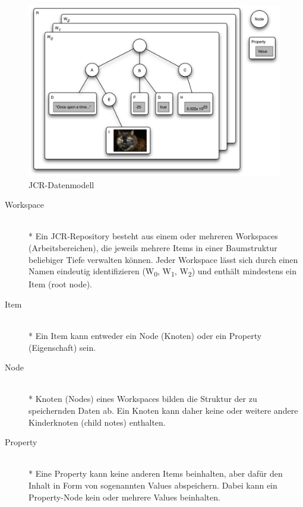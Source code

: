 \begin{figure}[!h]
\begin{center}
\includegraphics[scale=0.3]{images/repository/repository_diagramm.png}
\caption{JCR-Datenmodell}
\label{jcrdatenmodell}
\end{center}
\end{figure} 



\begin{description}
\item[Workspace]\mbox{~}\\*
Ein JCR-Repository besteht aus einem oder mehreren Workspaces (Arbeitsbereichen), die jeweils mehrere Items in einer Baumstruktur beliebiger Tiefe verwalten können. Jeder Workspace lässt sich durch einen Namen eindeutig identifizieren (W\textsubscript{0}, W\textsubscript{1}, W\textsubscript{2}) und enthält mindestens ein Item (root node).
\item[Item]\mbox{~}\\*
Ein Item kann entweder ein Node (Knoten) oder ein Property (Eigenschaft) sein.
\item[Node]\mbox{~}\\*
Knoten (Nodes) eines Workspaces bilden die Struktur der zu speichernden Daten ab.
Ein Knoten kann daher keine oder weitere andere Kinderknoten (child notes) enthalten.
\item[Property]\mbox{~}\\*
Eine Property kann keine anderen Items beinhalten, aber dafür den Inhalt in Form von sogenannten Values abspeichern. Dabei kann ein Property-Node kein oder mehrere Values beinhalten.
\end{description}




